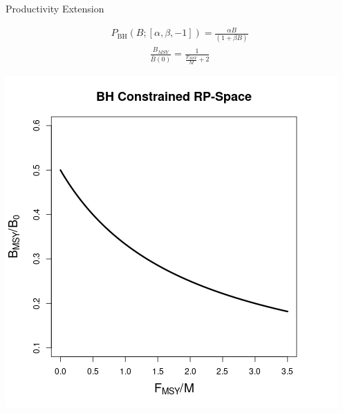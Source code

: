 \documentclass[ xcolor = pdftex, dvipsnames, table ]{beamer}
\begin{document}
%
\begin{frame}{Productivity Extension}
\begin{minipage}[h!]{0.49\textwidth}
\begin{align}
P_\text{BH}(B;[\alpha, \beta, -1]) = \frac{\alpha B}{(1+\beta B)} \nonumber
\end{align}
\begin{align}
\frac{B_{MSY}}{\bar B(0)} = \frac{1}{\frac{F_{MSY}}{M}+2} \nonumber
\end{align}
\end{minipage}
\begin{minipage}[h!]{0.49\textwidth}
\includegraphics[width=\textwidth]{../plots/bhRP.png}
\end{minipage}
\end{frame}
\end{document}
